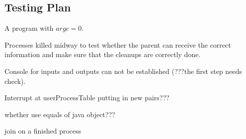 \documentclass{article}
\begin{document}
\begin{spacing}{1.1}
\subsection{Testing Plan}
\begin{asparaitem}
  \item A program with $argc=0$.
  \item Processes killed midway to test whether the parent can receive the correct information and make sure that the cleanups are correctly done.
  \item Console for inputs and outputs can not be established (???the first step needs check).
  \item Interrupt at userProcessTable putting in new pairs???
  \item whether use equals of java object???
  \item join on a finished process
\end{asparaitem}

\end{spacing}
\end{document}
